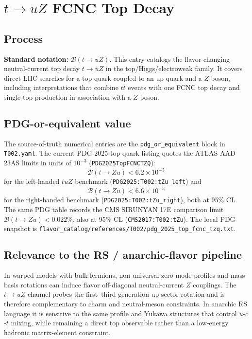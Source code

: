 
\section{\texorpdfstring{\(t\to u Z\)}{t -> u Z} FCNC Top Decay}

\subsection*{Process}
\textbf{Standard notation:} \(\mathcal{B}(t\to uZ)\).
This entry catalogs the flavor-changing neutral-current top decay \(t\to uZ\)
in the top/Higgs/electroweak family.  It covers direct LHC searches for a top
quark coupled to an up quark and a \(Z\) boson, including interpretations that
combine \(t\bar t\) events with one FCNC top decay and single-top production in
association with a \(Z\) boson.

\subsection*{PDG-or-equivalent value}
The source-of-truth numerical entries are the
\texttt{pdg\_or\_equivalent} block in \texttt{T002.yaml}.  The current PDG
2025 top-quark listing quotes the ATLAS AAD 23AS limits in units of
\(10^{-3}\) (\texttt{PDG2025TopFCNCTZQ}):
\[
  \mathcal{B}(t\to Zu) < 6.2\times 10^{-5}
\]
for the left-handed \(tuZ\) benchmark
(\texttt{PDG2025:T002:tZu\_left}) and
\[
  \mathcal{B}(t\to Zu) < 6.6\times 10^{-5}
\]
for the right-handed benchmark (\texttt{PDG2025:T002:tZu\_right}), both at
95\% CL.  The same PDG table records the CMS SIRUNYAN 17E comparison limit
\(\mathcal{B}(t\to Zu)<0.022\%\), also at 95\% CL
(\texttt{CMS2017:T002:tZu}).  The local PDG snapshot is
\texttt{flavor\_catalog/references/T002/pdg\_2025\_top\_fcnc\_tzq.txt}.

\subsection*{Relevance to the RS / anarchic-flavor pipeline}
In warped models with bulk fermions, non-universal zero-mode profiles and
mass-basis rotations can induce flavor off-diagonal neutral-current \(Z\)
couplings.  The \(t\to uZ\) channel probes the first--third generation
up-sector rotation and is therefore complementary to charm and neutral-meson
constraints.  In anarchic RS language it is sensitive to the same profile and
Yukawa structures that control \(u\)-\(c\)-\(t\) mixing, while remaining a
direct top observable rather than a low-energy hadronic matrix-element
constraint.

